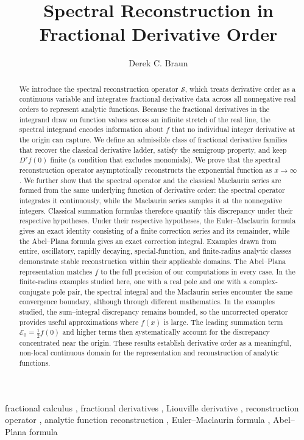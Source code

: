 \documentclass[preprint, 12pt]{elsarticle}
\theoremstyle{definition}
\theoremstyle{plain}
\theoremstyle{remark}
\begin{document}
\begin{frontmatter}

\title{Spectral Reconstruction in Fractional Derivative Order}

\author{Derek C. Braun}
\address{School of Science, Technology, Accessibility, Mathematics and Public Health, Gallaudet University, Washington, DC 20002, USA}

\begin{abstract}
We introduce the spectral reconstruction operator $\mathcal{S}$, which treats derivative order as a continuous variable and integrates fractional derivative data across all nonnegative real orders to represent analytic functions. Because the fractional derivatives in the integrand draw on function values across an infinite stretch of the real line, the spectral integrand encodes information about $f$ that no individual integer derivative at the origin can capture. We define an admissible class of fractional derivative families that recover the classical derivative ladder, satisfy the semigroup property, and keep $D^r f(0)$ finite (a condition that excludes monomials). We prove that the spectral reconstruction operator asymptotically reconstructs the exponential function as $x\to\infty$. We further show that the spectral operator and the classical Maclaurin series are formed from the same underlying function of derivative order: the spectral operator integrates it continuously, while the Maclaurin series samples it at the nonnegative integers. Classical summation formulas therefore quantify this discrepancy under their respective hypotheses. Under their respective hypotheses, the Euler--Maclaurin formula gives an exact identity consisting of a finite correction series and its remainder, while the Abel--Plana formula gives an exact correction integral. Examples drawn from entire, oscillatory, rapidly decaying, special-function, and finite-radius analytic classes demonstrate stable reconstruction within their applicable domains. The Abel--Plana representation matches $f$ to the full precision of our computations in every case. In the finite-radius examples studied here, one with a real pole and one with a complex-conjugate pole pair, the spectral integral and the Maclaurin series encounter the same convergence boundary, although through different mathematics. In the examples studied, the sum--integral discrepancy remains bounded, so the uncorrected operator provides useful approximations where $f(x)$ is large. The leading summation term $\mathcal{E}_0=\frac{1}{2}f(0)$ and higher terms then systematically account for the discrepancy concentrated near the origin. These results establish derivative order as a meaningful, non-local continuous domain for the representation and reconstruction of analytic functions.
\end{abstract}

\begin{keyword}
fractional calculus \sep
fractional derivatives \sep
Liouville derivative \sep
reconstruction operator \sep
analytic function reconstruction \sep
Euler--Maclaurin formula \sep
Abel--Plana formula
\end{keyword}
\end{frontmatter}
\end{document}

